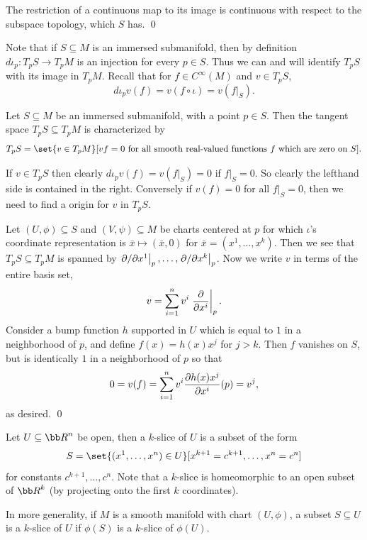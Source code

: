 \ecoro

\bproof

    The restriction of a continuous map to its image is continuous with respect to the subspace topology, which $S$ has.
    \qed

\eproof

Note that if $S\subseteq M$ is an immersed submanifold, then by definition $d\iota_p\colon T_pS\to T_pM$ is an injection for every $p\in S$.
Thus we can and will identify $T_pS$ with its image in $T_pM$.
Recall that for $f\in C^\infty(M)$ and $v\in T_pS$,
$$ d\iota_pv(f) = v(f\circ\iota) = v(f|_S) . $$

\bprop

    Let $S\subseteq M$ be an immersed submanifold, with a point $p\in S$.
    Then the tangent space $T_pS\subseteq T_pM$ is characterized by
    $$ T_pS = \set{v\in T_pM}[\hbox{$vf=0$ for all smooth real-valued functions $f$ which are zero on $S$}] . $$

\eprop

\bproof

    If $v\in T_pS$ then clearly $d\iota_pv(f)=v(f|_S)=0$ if $f|_S=0$.
    So clearly the lefthand side is contained in the right.
    Conversely if $v(f)=0$ for all $f|_S=0$, then we need to find a origin for $v$ in $T_pS$.

    Let $(U,\phi)\subseteq S$ and $(V,\psi)\subseteq M$ be charts centered at $p$ for which $\iota$'s coordinate representation is
    $\bar x\mapsto(\bar x,0)$ for $\bar x=(x^1,\dots,x^k)$.
    Then we see that $T_pS\subseteq T_pM$ is spanned by $\left.\partial /\partial x^1\right|_p,\dots,\left.\partial /\partial x^k\right|_p$.
    Now we write $v$ in terms of the entire basis set,
    $$ v = \sum_{i=1}^nv^i\left.{{\partial }\over{\partial x^i}}\right|_p . $$
    Consider a bump function $h$ supported in $U$ which is equal to $1$ in a neighborhood of $p$, and define $f(x)=h(x)x^j$ for $j>k$.
    Then $f$ vanishes on $S$, but is identically $1$ in a neighborhood of $p$ so that
    $$ 0 = v(f) = \sum_{i=1}^n v^i{{\partial h(x)x^j}\over{\partial x^i}}(p) = v^j , $$
    as desired.
    \qed

\eproof

\bdefn

    Let $U\subseteq\bR^n$ be open, then a {\emphcolor $k$-slice} of $U$ is a subset of the form
    $$ S = \set{(x^1,\dots,x^n)\in U}[x^{k+1}=c^{k+1},\dots,x^n=c^n] $$
    for constants $c^{k+1},\dots,c^n$.
    Note that a $k$-slice is homeomorphic to an open subset of $\bR^k$ (by projecting onto the first $k$ coordinates).

    In more generality, if $M$ is a smooth manifold with chart $(U,\phi)$, a subset $S\subseteq U$ is a {\emphcolor $k$-slice}
    of $U$ if $\phi(S)$ is a $k$-slice of $\phi(U)$.

